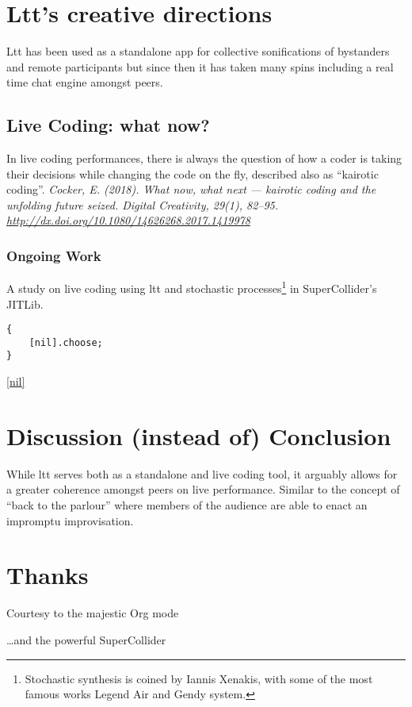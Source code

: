 \documentclass[11pt]{article}
\begin{document}
\section*{Ltt's creative directions}
\label{sec:org9aef2df}
\begin{NOTES}
Ltt has been used as a standalone app for collective sonifications of bystanders and remote participants but since then it has taken many spins including a real time chat engine amongst peers.
\end{NOTES}

\subsection*{Live Coding: what now?}
\label{sec:org5e6861f}
In live coding performances, there is always the question of how a coder is taking their decisions while changing the code on the fly, described also as ``kairotic coding''. \emph{Cocker, E. (2018). What now, what next — kairotic coding and the unfolding future seized. Digital Creativity, 29(1), 82–95. \url{http://dx.doi.org/10.1080/14626268.2017.1419978}}

\subsubsection*{Ongoing Work}
\label{sec:org41313e7}
A study on live coding using ltt and stochastic processes\footnote{Stochastic synthesis is coined by Iannis Xenakis, with some of the most famous works Legend Air and Gendy system.} in SuperCollider's JITLib.
\begin{verbatim}
{
	[nil].choose;
}
\end{verbatim}

\href{https://youtube.com/watch?v=IrGk0yrfbOY}{[nil]​}

\section*{Discussion (instead of) Conclusion}
\label{sec:orgad60544}
While ltt serves both as a standalone and live coding tool, it arguably allows for a greater coherence amongst peers on live performance. Similar to the concept of ``back to the parlour'' where members of the audience are able to enact an impromptu improvisation.

\section*{Thanks}
\label{sec:org96c2b98}
Courtesy to the majestic Org mode
\begin{center}

\end{center}

\ldots{}and the powerful SuperCollider
\begin{center}

\end{center}
\end{document}
